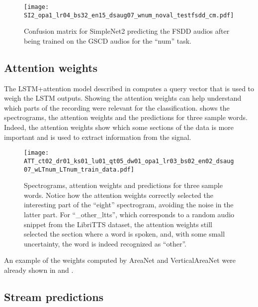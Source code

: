 \begin{figure}[t!]
    \centering
    \texttt{[image: SI2\_opa1\_lr04\_bs32\_en15\_dsaug07\_wnum\_noval\_testfsdd\_cm.pdf]}
    \caption{Confusion matrix for SimpleNet2 predicting the
        FSDD audios after being trained on the GSCD audios for the ``num'' task.
    }%
    \label{fig:SI2_opa1_lr04_bs32_en15_dsaug07_wnum_noval_testfsdd_cm}
\end{figure}

\subsection{Attention weights}

The LSTM+attention model described in  computes a query
vector that is used to weigh the LSTM outputs. Showing the attention weights
can help understand which parts of the recording were relevant for the
classification.
 shows the spectrograms, the attention
weights and the predictions for three sample words.
Indeed, the attention weights show which some sections of the data is more important
and is used to extract information from the signal.

\begin{figure*}[t!]
    \centering
    \texttt{[image: ATT\_ct02\_dr01\_ks01\_lu01\_qt05\_dw01\_opa1\_lr03\_bs02\_en02\_dsaug07\_wLTnum\_LTnum\_train\_data.pdf]}
    \caption{Spectrograms, attention weights and predictions for three sample words.
    Notice how the attention weights correctly selected the interesting part of
    the ``eight'' spectrogram, avoiding the noise in the latter part.
    For ``\_other\_ltts'', which corresponds to a random audio snippet from the LibriTTS
    dataset, the attention weights still selected the section where a word is spoken,
    and, with some small uncertainty, the word is indeed recognized as ``other''.}%
    \label{fig:attention_weights_standard}
\end{figure*}

An example of the weights computed by AreaNet and VerticalAreaNet were already shown 
in  and .

\subsection{Stream predictions}

